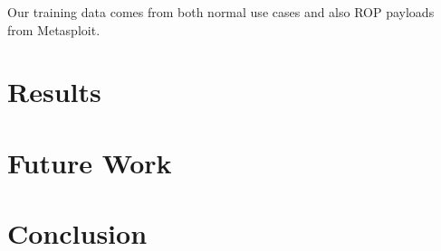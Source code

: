\documentclass[letterpaper,twocolumn,10pt]{article}
\begin{document}
Our training data comes from both normal use cases and also ROP payloads from Metasploit.

\section{Results}

\section{Future Work}

\section{Conclusion}

{\footnotesize 
}


\theendnotes
\end{document}
